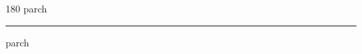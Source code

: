 
\begin{frame}
\begin{center}
\begin{turn}{180}
{\fontsize{2.5cm}{1em}\selectfont parch}
\end{turn}
\vspace{1em}\par  
\hrule
\vspace{1em}\par  
{\fontsize{2.5cm}{1em}\selectfont parch}
\end{center}
\end{frame}
